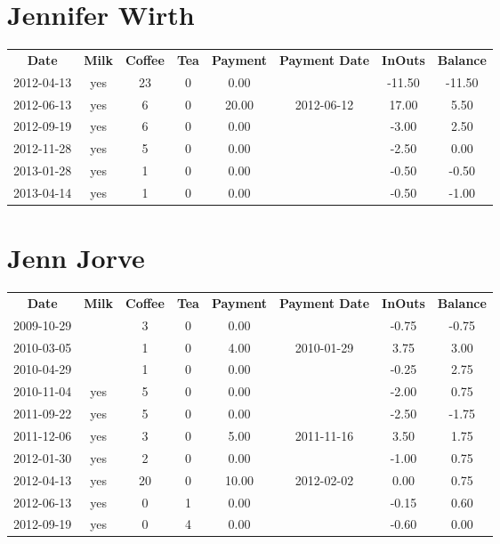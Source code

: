 \section{Jennifer Wirth}

\begin{center}
\begin{tabular}{cccccccc}
\textbf{Date} & \textbf{Milk} & \textbf{Coffee} & \textbf{Tea} & \textbf{Payment} & \textbf{Payment Date} & \textbf{InOuts} & \textbf{Balance} \\
2012-04-13 & yes & 23 & 0 &  0.00 &  & -11.50 & -11.50\\ 
2012-06-13 & yes &  6 & 0 & 20.00 & 2012-06-12 &  17.00 &   5.50\\ 
2012-09-19 & yes &  6 & 0 &  0.00 &  &  -3.00 &   2.50\\ 
2012-11-28 & yes &  5 & 0 &  0.00 &  &  -2.50 &   0.00\\ 
2013-01-28 & yes &  1 & 0 &  0.00 &  &  -0.50 &  -0.50\\ 
2013-04-14 & yes &  1 & 0 &  0.00 &  &  -0.50 &  -1.00
\end{tabular}
\end{center}

\section{Jenn Jorve}

\begin{center}
\begin{tabular}{cccccccc}
\textbf{Date} & \textbf{Milk} & \textbf{Coffee} & \textbf{Tea} & \textbf{Payment} & \textbf{Payment Date} & \textbf{InOuts} & \textbf{Balance} \\
2009-10-29 &  &  3 & 0 &  0.00 &  & -0.75 & -0.75\\ 
2010-03-05 &  &  1 & 0 &  4.00 & 2010-01-29 &  3.75 &  3.00\\ 
2010-04-29 &  &  1 & 0 &  0.00 &  & -0.25 &  2.75\\ 
2010-11-04 & yes &  5 & 0 &  0.00 &  & -2.00 &  0.75\\ 
2011-09-22 & yes &  5 & 0 &  0.00 &  & -2.50 & -1.75\\ 
2011-12-06 & yes &  3 & 0 &  5.00 & 2011-11-16 &  3.50 &  1.75\\ 
2012-01-30 & yes &  2 & 0 &  0.00 &  & -1.00 &  0.75\\ 
2012-04-13 & yes & 20 & 0 & 10.00 & 2012-02-02 &  0.00 &  0.75\\ 
2012-06-13 & yes &  0 & 1 &  0.00 &  & -0.15 &  0.60\\ 
2012-09-19 & yes &  0 & 4 &  0.00 &  & -0.60 &  0.00
\end{tabular}
\end{center}

